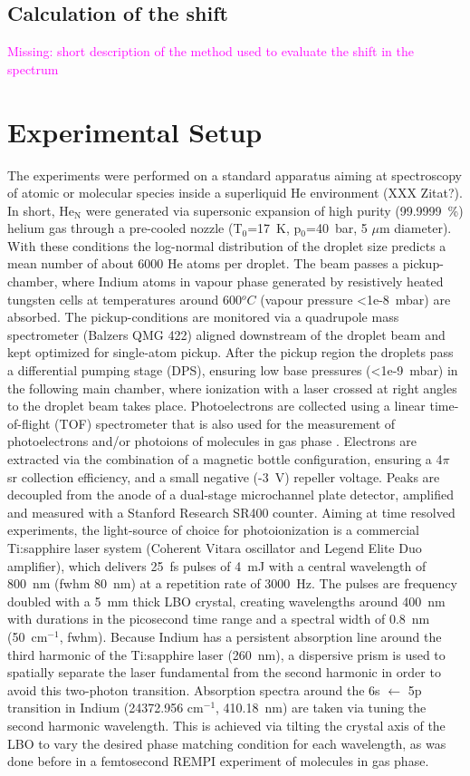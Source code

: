 \documentclass[twoside,twocolumn,9pt]{article}
\def\hl#1{\textcolor{magenta}{#1}}  %
\begin{document}
\subsection{Calculation of the shift}
\hl{Missing: short description of the method used to evaluate the shift in the spectrum}

\section{Experimental Setup}
The experiments were performed on a standard apparatus aiming at spectroscopy of atomic or molecular species inside a superliquid He environment (XXX Zitat?). In short, He$_\mathrm{N}$ were generated via supersonic expansion of high purity (99.9999~\%) helium gas through a pre-cooled nozzle (T$_\mathrm{0}$=17~K, p$_\mathrm{0}$=40~bar, 5 $\mu$m diameter). With these conditions the log-normal distribution of the droplet size predicts a mean number of about 6000 He atoms\cite{Harms1998:dropletsize} per droplet. The beam passes a pickup-chamber, where Indium atoms in vapour phase generated by resistively heated tungsten cells at temperatures around 600$^{o}C$ (vapour pressure <1e-8~mbar) are absorbed. The pickup-conditions are monitored via a quadrupole mass spectrometer (Balzers QMG 422) aligned downstream of the droplet beam and kept optimized for single-atom pickup. After the pickup region the droplets pass a differential pumping stage (DPS), ensuring low base pressures (<1e-9~mbar) in the following main chamber, where ionization with a laser crossed at right angles to the droplet beam takes place. Photoelectrons are collected using a linear time-of-flight (TOF) spectrometer that is also used for the measurement of photoelectrons and/or photoions of molecules in gas phase \cite{Maierhofer:2016acetone}. Electrons are extracted via the combination of a magnetic bottle configuration, ensuring a 4$\pi$ sr collection efficiency, and a small negative (-3~V) repeller voltage. Peaks are decoupled from the anode of a dual-stage microchannel plate detector, amplified and measured with a Stanford Research SR400 counter. Aiming at time resolved experiments, the light-source of choice for photoionization is a commercial Ti:sapphire laser system (Coherent Vitara oscillator and Legend Elite Duo amplifier), which delivers 25~fs pulses of 4~mJ with a central wavelength of 800~nm (fwhm 80~nm) at a repetition rate of 3000~Hz. The pulses are frequency doubled with a 5~mm thick LBO crystal, creating wavelengths around 400~nm with durations in the picosecond time range and a spectral width of 0.8~nm (50~cm$^{-1}$, fwhm). Because Indium has a persistent absorption line around the third harmonic of the Ti:sapphire laser (260~nm)\cite{NIST}, a dispersive prism is used to spatially separate the laser fundamental from the second harmonic in order to avoid this two-photon transition. Absorption spectra around the 6s $\leftarrow$ 5p transition in Indium (24372.956 cm$^{-1}$, 410.18~nm) are taken via tuning the second harmonic wavelength. This is achieved via tilting the crystal axis of the LBO to vary the desired phase matching condition for each wavelength, as was done before in a femtosecond REMPI experiment of molecules in gas phase\cite{koch2017direct}. 
\end{document}
